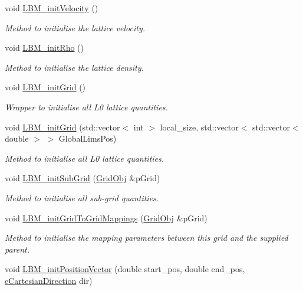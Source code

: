 \begin{DoxyCompactItemize}
void \hyperlink{class_grid_obj_aa8041f7344af6cf9732199aa107fdbc6}{L\+B\+M\+\_\+init\+Velocity} ()
\begin{DoxyCompactList}\small\item\em Method to initialise the lattice velocity. \end{DoxyCompactList}\item 
void \hyperlink{class_grid_obj_aac0e8a3fe74c69b3308ef3e19100f95c}{L\+B\+M\+\_\+init\+Rho} ()
\begin{DoxyCompactList}\small\item\em Method to initialise the lattice density. \end{DoxyCompactList}\item 
void \hyperlink{class_grid_obj_aeea74cc13001620abec1ba819233f714}{L\+B\+M\+\_\+init\+Grid} ()
\begin{DoxyCompactList}\small\item\em Wrapper to initialise all L0 lattice quantities. \end{DoxyCompactList}\item 
void \hyperlink{class_grid_obj_afbaf6155b26acb6a21dcf7be68520607}{L\+B\+M\+\_\+init\+Grid} (std\+::vector$<$ int $>$ local\+\_\+size, std\+::vector$<$ std\+::vector$<$ double $>$ $>$ Global\+Lims\+Pos)
\begin{DoxyCompactList}\small\item\em Method to initialise all L0 lattice quantities. \end{DoxyCompactList}\item 
void \hyperlink{class_grid_obj_a697f4d7fc6c9ed18e609528847b1e175}{L\+B\+M\+\_\+init\+Sub\+Grid} (\hyperlink{class_grid_obj}{Grid\+Obj} \&p\+Grid)
\begin{DoxyCompactList}\small\item\em Method to initialise all sub-\/grid quantities. \end{DoxyCompactList}\item 
void \hyperlink{class_grid_obj_a7a4c2d4eb5bc8f312d0998a55b38f0e2}{L\+B\+M\+\_\+init\+Grid\+To\+Grid\+Mappings} (\hyperlink{class_grid_obj}{Grid\+Obj} \&p\+Grid)
\begin{DoxyCompactList}\small\item\em Method to initialise the mapping parameters between this grid and the supplied parent. \end{DoxyCompactList}\item 
void \hyperlink{class_grid_obj_a32da287cacc2cbd15c3cee482ea4b010}{L\+B\+M\+\_\+init\+Position\+Vector} (double start\+\_\+pos, double end\+\_\+pos, \hyperlink{stdafx_8h_afbad8e4a2f1e9903755b1bd2fe8273cf}{e\+Cartesian\+Direction} dir)

\end{DoxyCompactItemize}
